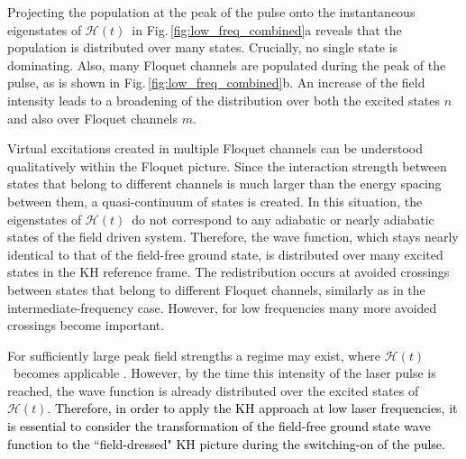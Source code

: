 \documentclass[
pra%
,preprint%
,amssymb, nobibnotes, aps, superscriptaddress, floatfix]{revtex4}
\newcommand{\fig}{Fig.\,}
\newcommand{\CAHt}{$\mathcal{H}(t)$}
\newcommand{\editt}[1]{\textcolor{black}{#1}}
\newcommand{\hide}[1]{}
\begin{document}
Projecting the population at the peak of the pulse onto the instantaneous eigenstates of \CAHt\ in \fig \ref{fig:low_freq_combined}a
reveals that the population is distributed over many states. Crucially, no single state is dominating. 
Also, many Floquet channels are populated during the peak of the pulse, as is shown in \fig \ref{fig:low_freq_combined}b.
An increase of the field intensity leads to a broadening of the distribution over both the excited states $n $ and also over Floquet channels $m$.

Virtual excitations created in multiple Floquet channels can be understood qualitatively within the Floquet picture. Since the interaction strength between states that belong to different channels is much larger than the energy spacing between them, a quasi-continuum of states is created. 
In this situation, the eigenstates of \CAHt\ do not correspond to any adiabatic or nearly adiabatic states of the  field driven system. Therefore, the wave function, which stays nearly identical to that of the field-free ground state, is distributed over many excited states in the KH reference frame. 
The redistribution occurs at avoided crossings between states that belong to different Floquet channels, similarly as in the intermediate-frequency case. However, for low frequencies many more avoided crossings become important.

For sufficiently large peak field strengths a regime may exist, where \CAHt\ becomes applicable \cite{Popov1999,Smirnova2000,Popov2011}. However, by the time this intensity of the laser pulse is reached, the wave function is already distributed over the excited states of \CAHt. \hide{Therefore, the transformation of the field-free ground state to the ``field-dressed" KH picture, which is determined by the switching on of the laser pulse, is an essential step in order to apply the KH approach at low laser frequencies.}
\editt{Therefore, in order to apply the KH approach at low laser frequencies, it is essential to consider the transformation of the field-free ground state wave function to the ``field-dressed" KH picture during the switching-on of the pulse.}
\end{document}

